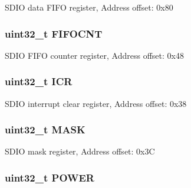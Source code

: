 S\-D\-I\-O data F\-I\-F\-O register, Address offset\-: 0x80 \hypertarget{struct_s_d_i_o___type_def_ab27b78e19f487c845437c29812eecca7}{
\subsubsection[{F\-I\-F\-O\-C\-N\-T}]{ uint32\-\_\-t F\-I\-F\-O\-C\-N\-T}}\label{struct_s_d_i_o___type_def_ab27b78e19f487c845437c29812eecca7}
S\-D\-I\-O F\-I\-F\-O counter register, Address offset\-: 0x48 \hypertarget{struct_s_d_i_o___type_def_a0a8c8230846fd8ff154b9fde8dfa0399}{
\subsubsection[{I\-C\-R}]{ uint32\-\_\-t I\-C\-R}}\label{struct_s_d_i_o___type_def_a0a8c8230846fd8ff154b9fde8dfa0399}
S\-D\-I\-O interrupt clear register, Address offset\-: 0x38 \hypertarget{struct_s_d_i_o___type_def_a5c955643593b4aedbe9f84f054d26522}{
\subsubsection[{M\-A\-S\-K}]{ uint32\-\_\-t M\-A\-S\-K}}\label{struct_s_d_i_o___type_def_a5c955643593b4aedbe9f84f054d26522}
S\-D\-I\-O mask register, Address offset\-: 0x3\-C \hypertarget{struct_s_d_i_o___type_def_a65bff76f3af24c37708a1006d54720c7}{
\subsubsection[{P\-O\-W\-E\-R}]{ uint32\-\_\-t P\-O\-W\-E\-R}}\label{struct_s_d_i_o___type_def_a65bff76f3af24c37708a1006d54720c7}
